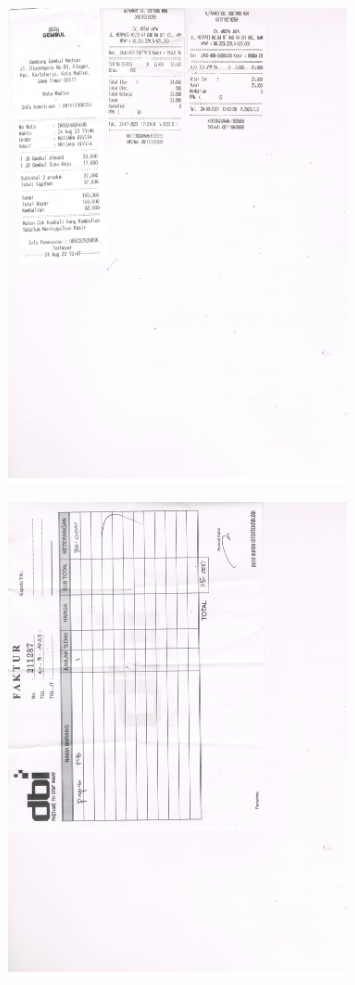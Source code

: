 \documentclass{article} %
\begin{document}
	\begin{figure}[H]
		\centering
		\includegraphics[width=0.8\textwidth]{images/konsum}
	\end{figure}

	\begin{figure}[H]
		\centering
		\includegraphics[width=0.8\textwidth]{images/pcb_holder}
	\end{figure}
\end{document}
